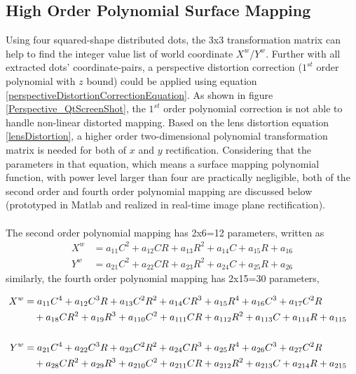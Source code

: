 \subsection{High Order Polynomial Surface Mapping}
%
Using four squared-shape distributed dots, the 3x3 transformation matrix can help to find the integer value list of  world coordinate \(X^w\)/\(Y^w\). Further with all extracted dots' coordinate-pairs, a perspective distortion correction (\(1^{st}\) order polynomial with \(z\) bound) could be applied using equation \ref{perspectiveDistortionCorrectionEquation}. As shown in figure \ref{Perspective_QtScreenShot}, the \(1^{st}\) order polynomial correction is not able to handle non-linear distorted mapping. Based on the lens distortion equation \ref{lensDistortion}, a higher order two-dimensional polynomial transformation matrix is needed for both of \(x\) and \(y\) rectification. Considering that the parameters in that equation, which means a surface mapping polynomial function, with power level larger than four are practically negligible, both of the second order and fourth order polynomial mapping are discussed below (prototyped in Matlab and realized in real-time image plane rectification).\\\\%
%
The second order polynomial mapping has 2x6=12 parameters, written as %
%
\begin{equation}
%
\begin{aligned}
X^w &=  a_{11}C^2 + a_{12}CR + a_{13}R^2 + a_{14}C + a_{15}R + a_{16}
\\%
Y^w &=  a_{21}C^2 + a_{22}CR + a_{23}R^2 + a_{24}C + a_{25}R + a_{26}
\end{aligned}
\label{secondOrderPolynomial}
%
\end{equation}%
%
similarly, the fourth order polynomial mapping has 2x15=30 parameters,\par%
%
\begin{equation}
%
\hspace*{-0.3cm}%
\begin{aligned}
X^w &=  a_{11}C^4 + a_{12}C^3R + a_{13}C^2R^2 + a_{14}CR^3 + a_{15}R^4 + a_{16}C^3 + a_{17}C^2R \\%
&\,\,\,\,\,\,+ a_{18}CR^2 + a_{19}R^3 + a_{110}C^2 + a_{111}CR + a_{112}R^2 + a_{113}C + a_{114}R + a_{115}
\\\\%
Y^w &=  a_{21}C^4 + a_{22}C^3R + a_{23}C^2R^2 + a_{24}CR^3 + a_{25}R^4 + a_{26}C^3 + a_{27}C^2R \\%
&\,\,\,\,\,\,+ a_{28}CR^2 + a_{29}R^3 + a_{210}C^2 + a_{211}CR + a_{212}R^2 + a_{213}C + a_{214}R + a_{215}
\end{aligned}
\label{fourthOrderPolynomial}
%
\end{equation}%
